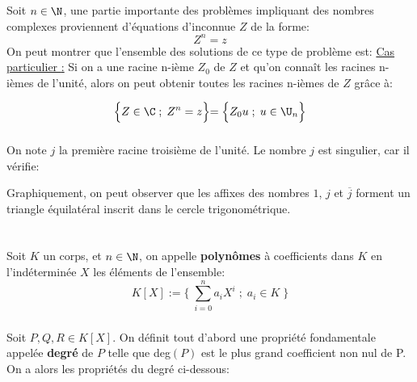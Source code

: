 \subsection*{}
Soit \(n \in \N\), une partie importante des problèmes impliquant des nombres complexes proviennent d'équations d'inconnue \(Z\) de la forme:
\[
   Z^n = z
\]
On peut montrer que l'ensemble des solutions de ce type de problème est:
\underline{Cas particulier {:}}
Si on a une racine n-ième \(Z_0\) de \(Z\) et qu'on connaît les racines n-ièmes de l'unité, alors on peut obtenir toutes les racines n-ièmes de \(Z\) grâce à:

\[
   \Bigl\{ Z \in \C \; ; \; Z^n = z \Bigl\} = \Bigl\{ Z_0u \; ; \; u \in \U_n \Bigl\}   
\]

\subsection*{}
On note \(j\) la première racine troisième de l'unité.
Le nombre \(j\) est singulier, car il vérifie:

Graphiquement, on peut observer que les affixes des nombres \(1\), \(j\) et \(\overline{j}\) forment un triangle équilatéral inscrit dans le cercle trigonométrique.

\chapter*{} %

\subsection*{}
Soit \(K\) un corps, et \(n \in \N\), on appelle \textbf{polynômes} à coefficients dans \(K\) en l'indéterminée \(X\) les éléments de l'ensemble:
\[
   K[X] := \Biggl\{ \; \sum_{i=0}^n a_{i}X^{i} \; ; \; a_i \in K \;\Biggl\}
\]

\subsection*{}
Soit \(P, Q, R \in K[X]\).\+
On définit tout d'abord une propriété fondamentale appelée \textbf{degré} de \(P\) telle que deg\((P)\) est le plus grand coefficient non nul de P.
On a alors les propriétés du degré ci-dessous:

